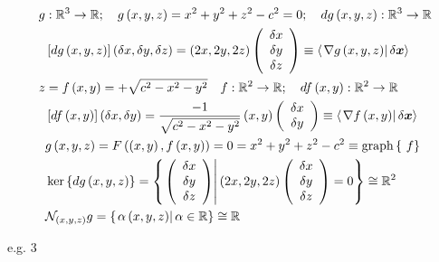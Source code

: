 \documentclass[aps,preprint]{revtex4}%
\begin{document}
\begin{align*}
g  &  :\mathbb{R}^{3}\rightarrow\mathbb{R};\quad g\left(  x,y,z\right)
=x^{2}+y^{2}+z^{2}-c^{2}=0;\quad dg\left(  x,y,z\right)  :\mathbb{R}%
^{3}\rightarrow\mathbb{R}\\
&  \left[  dg\left(  x,y,z\right)  \right]  \left(  \delta x,\delta y,\delta
z\right)  =\left(  2x,2y,2z\right)  \left(
\begin{array}
[c]{c}%
\delta x\\
\delta y\\
\delta z
\end{array}
\right)  \equiv\left\langle \left.  \nabla g\left(  x,y,z\right)  \right\vert
\delta\boldsymbol{x}\right\rangle \\
z  &  =f\left(  x,y\right)  =+\sqrt{c^{2}-x^{2}-y^{2}}\quad f:\mathbb{R}%
^{2}\rightarrow\mathbb{R};\quad df\left(  x,y\right)  :\mathbb{R}%
^{2}\rightarrow\mathbb{R}\\
&  \left[  df\left(  x,y\right)  \right]  \left(  \delta x,\delta y\right)
=\frac{-1}{\sqrt{c^{2}-x^{2}-y^{2}}}\left(  x,y\right)  \left(
\begin{array}
[c]{c}%
\delta x\\
\delta y
\end{array}
\right)  \equiv\left\langle \left.  \nabla f\left(  x,y\right)  \right\vert
\delta\boldsymbol{x}\right\rangle \\
&  g\left(  x,y,z\right)  =F\left(  \left(  x,y\right)  ,f\left(  x,y\right)
\right)  =0=x^{2}+y^{2}+z^{2}-c^{2}\equiv\operatorname*{graph}\left\{  \text{
}f\right\} \\
&  \ker\left\{  dg\left(  x,y,z\right)  \right\}  =\left\{  \left.  \left(
\begin{array}
[c]{c}%
\delta x\\
\delta y\\
\delta z
\end{array}
\right)  \right\vert \left(  2x,2y,2z\right)  \left(
\begin{array}
[c]{c}%
\delta x\\
\delta y\\
\delta z
\end{array}
\right)  =0\right\}  \cong\mathbb{R}^{2}\\
&  \mathcal{N}_{\left(  x,y,z\right)  }g=\left\{  \left.  \alpha\left(
x,y,z\right)  \right\vert \alpha\in\mathbb{R}\right\}  \cong\mathbb{R}%
\end{align*}


e.g. 3%
\end{document}
